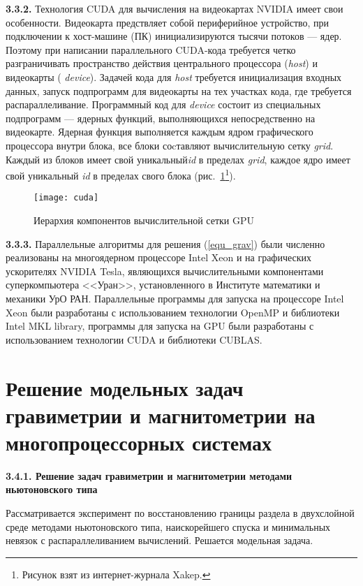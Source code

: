 {\bfseries 3.3.2.} Технология CUDA для вычисления на видеокартах NVIDIA имеет свои особенности. Видеокарта предствляет собой периферийное устройство, при подключении к хост-машине (ПК) инициализируются тысячи потоков --- ядер. Поэтому при написании параллельного CUDA-кода требуется четко разграничивать пространство действия центрального процессора (\textit{host}) и видеокарты (\textit{ device}). Задачей кода для \textit{host} требуется инициализация входных данных, запуск подпрограмм для видеокарты на тех участках кода, где требуется распараллеливание. Программный код для \textit{device} состоит из специальных подпрограмм --- ядерных функций, выполняющихся непосредственно на видеокарте. Ядерная функция выполняется каждым ядром графического процессора внутри блока, все блоки соcтавляют вычислительную сетку \textit{grid}. Каждый из блоков имеет свой уникальный\textit{id} в пределах \textit{grid}, каждое ядро имеет свой уникальный \textit{id} в пределах свого блока (рис.~\ref{fig:cuda}\footnote{Рисунок взят из интернет-журнала Xakep.}).  

\begin{figure}
	\centering
	\texttt{[image: cuda]}
	\caption{Иерархия компонентов вычислительной сетки GPU}
	\label{fig:cuda}
\end{figure}

{\bfseries 3.3.3.} Параллельные алгоритмы для решения (\ref{equ_grav}) были численно реализованы на многоядерном процессоре Intel Xeon и на графических ускорителях NVIDIA Tesla, являющихся вычислительными компонентами суперкомпьютера <<Уран>>, установленного в Институте математики и механики УрО РАН. Параллельные программы для запуска на процессоре Intel Xeon были разработаны с использованием технологии OpenMP и библиотеки Intel MKL library, программы для запуска на GPU были разработаны с использованием технологии CUDA и библиотеки CUBLAS. 

\newpage
\section{Решение модельных задач гравиметрии и магнитометрии на многопроцессорных системах}

{\bfseries 3.4.1. Решение задач гравиметрии и магнитометрии методами ньютоновского типа} 

Рассматривается эксперимент по восстановлению границы раздела в двухслойной среде методами ньютоновского типа, наискорейшего спуска и минимальных невязок с распараллеливанием вычислений. Решается модельная задача. 


